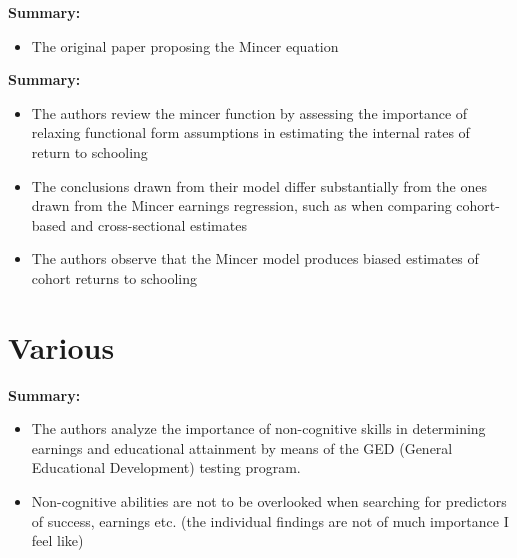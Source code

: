 {\center\large\cite{mincer1974schooling}\par}

\textbf{Summary:} 
\begin{itemize}
    \item The original paper proposing the Mincer equation
\end{itemize}


{\center\large\cite{heckman2003fifty}\par}

\textbf{Summary:} 
\begin{itemize}
    \item The authors review the mincer function by assessing the importance of relaxing functional form assumptions in estimating the internal rates of return to schooling
    \item The conclusions drawn from their model differ substantially from the ones drawn from the Mincer earnings regression, such as when comparing cohort-based and cross-sectional estimates
    \item The authors observe that the Mincer model produces biased estimates of cohort returns to schooling
\end{itemize}




\clearpage

\section*{Various}

{\center\large\cite{heckman2001importance}\par}

\textbf{Summary:} 
\begin{itemize}
    \item The authors analyze the importance of non-cognitive skills in determining earnings and educational attainment by means of the GED (General Educational Development) testing program.
    \item Non-cognitive abilities are not to be overlooked when searching for predictors of success, earnings etc. (the individual findings are not of much importance I feel like)
\end{itemize}



